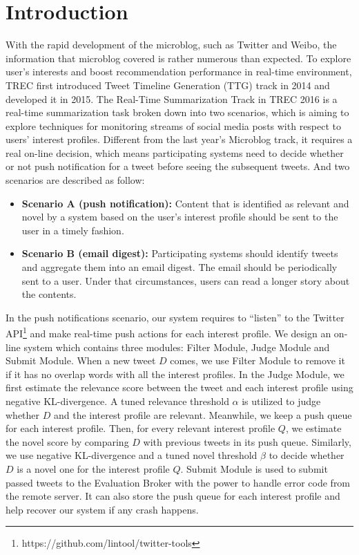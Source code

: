 \section{Introduction}
With the rapid development of the microblog, such as Twitter and Weibo,
the information that microblog covered is rather numerous than expected.
To explore user's interests and boost recommendation performance in real-time environment,
TREC first introduced Tweet Timeline Generation (TTG) track in 2014\cite{lin2014overview} and developed it in 2015.
The Real-Time Summarization Track in TREC 2016 is a real-time summarization task broken down into two scenarios,
which is aiming to explore techniques for monitoring streams of social media posts with respect to users' interest profiles.
Different from the last year's Microblog track, it requires a real on-line decision,
which means participating systems need to decide whether or
not push notification for a tweet before seeing the subsequent tweets.
And two scenarios are described as follow:

\begin{itemize}
\item \textbf{Scenario A (push notification):}
Content that is identified as relevant and novel by a system based
on the user's interest profile should be sent to the user in a timely fashion. 
\item \textbf{Scenario B (email digest):}
Participating systems should identify tweets and aggregate them into an email digest.
The email should be periodically sent to a user. Under that circumstances,
users can read a longer story about the contents.
\end{itemize}

In the push notifications scenario, our system requires to ``listen'' to
the Twitter API\footnote{https://github.com/lintool/twitter-tools}
and make real-time push actions for each interest profile.
We design an on-line system which contains three modules:
Filter Module, Judge Module and Submit Module.
When a new tweet $D$ comes, we use Filter Module to remove it
if it has no overlap words with all the interest profiles.
In the Judge Module, we first estimate the relevance score between the tweet
and each interest profile using negative KL-divergence.
A tuned relevance threshold $\alpha$ is utilized to judge whether $D$ and
the interest profile are relevant.
Meanwhile, we keep a push queue for each interest profile.
Then, for every relevant interest profile $Q$, we estimate the novel score by comparing $D$
with previous tweets in its push queue.
Similarly, we use negative KL-divergence and a tuned
novel threshold $\beta$ to decide whether $D$ is a novel one for the interest profile $Q$.
Submit Module is used to submit passed tweets to the Evaluation Broker with the power to 
handle error code from the remote server.
It can also store the push queue for each interest profile and help recover our system
if any crash happens.

